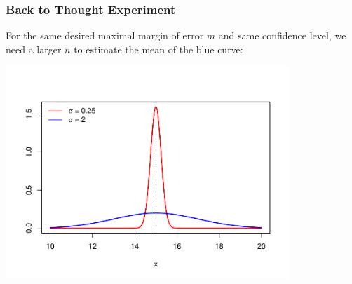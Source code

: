 \documentclass[handout]{beamer}
\begin{document}
\begin{frame}
\frametitle{Back to Thought Experiment}
For the same desired maximal margin of error $m$ and same confidence level, we need a larger $n$ to estimate the mean of the blue curve:
\begin{center}
\includegraphics[width=0.8\textwidth]{figure/norm.pdf}
\end{center}
\end{frame}
\end{document}

